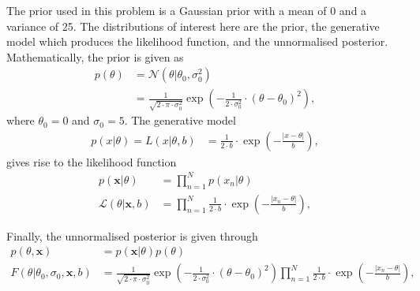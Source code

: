 \documentclass{article}
\begin{document}
	The prior used in this problem is a Gaussian prior with a mean of 0 and a variance of 25. The distributions of interest here are the prior, the generative model which produces the likelihood function, and the unnormalised posterior. Mathematically, the prior is given as
	\begin{equation}
		\begin{aligned}
			p(\theta) &= \mathcal{N}(\theta \vert \theta_0, \sigma_0^2) \\
			&= \frac{1}{\sqrt{2 \cdot \pi \cdot \sigma_0^2}} \exp \left( -\frac{1}{2 \cdot \sigma_0^2} \cdot \left( \theta - \theta_0 \right)^2 \right),
		\end{aligned}
	\end{equation}
	where $\theta_0 = 0$ and $\sigma_0 = 5$. The generative model
	\begin{equation}
		\begin{aligned}
			p(x \vert \theta) = L(x \vert \theta, b)
			&= \frac{1}{2 \cdot b} \cdot \exp \left( -\frac{\vert x - \theta \vert}{b} \right),
		\end{aligned}
	\end{equation}
	gives rise to the likelihood function
	\begin{equation}
		\begin{aligned}
			p(\mathbf{x} \vert \theta) &= \prod_{n=1}^{N} p(x_n \vert \theta) \\
			\mathcal{L}(\theta \vert \mathbf{x}, b) &= \prod_{n=1}^{N} \frac{1}{2 \cdot b} \cdot \exp \left( -\frac{\vert x_n - \theta \vert}{b} \right),
		\end{aligned}
	\end{equation}
	
	Finally, the unnormalised posterior is given through
	\begin{equation}\label{eq:unnormalised_posterior}
		\begin{aligned}
			p(\theta, \mathbf{x}) &= p(\mathbf{x} \vert \theta) p(\theta) \\
			F(\theta \vert \theta_0, \sigma_0, \mathbf{x}, b) &=  \frac{1}{\sqrt{2 \cdot \pi \cdot \sigma_0^2}} \exp \left( -\frac{1}{2 \cdot \sigma_0^2} \cdot \left( \theta - \theta_0 \right)^2 \right) \prod_{n=1}^{N} \frac{1}{2 \cdot b} \cdot \exp \left( -\frac{\vert x_n - \theta \vert}{b} \right),
		\end{aligned}
	\end{equation}
\end{document}
